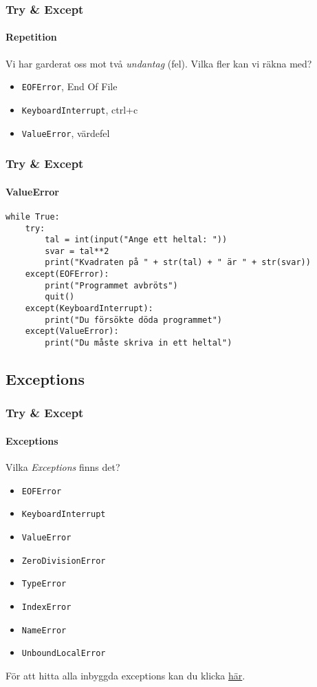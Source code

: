 \documentclass[aspectratio=169]{beamer}
\begin{document}
\begin{frame}
	\frametitle{Try \& Except}
	\framesubtitle{Repetition}
	
	Vi har garderat oss mot två \textit{undantag} (fel). Vilka fler kan vi räkna med?
	
	\begin{itemize}
		\item \texttt{EOFError}, End Of File
		\item \texttt{KeyboardInterrupt}, ctrl+c
		\item<2-> \texttt{ValueError}, värdefel
	\end{itemize}
\end{frame}

\begin{frame}[fragile]
	\frametitle{Try \& Except}
	\framesubtitle{ValueError}
	
	\begin{lstlisting}
while True:
    try:
        tal = int(input("Ange ett heltal: "))
        svar = tal**2
        print("Kvadraten på " + str(tal) + " är " + str(svar))
    except(EOFError):
        print("Programmet avbröts")
        quit()
    except(KeyboardInterrupt):
        print("Du försökte döda programmet")
    except(ValueError):
        print("Du måste skriva in ett heltal")
	\end{lstlisting}
	
\end{frame}

\subsection{Exceptions}

\begin{frame}
	\frametitle{Try \& Except}
	\framesubtitle{Exceptions}
	
	Vilka \textit{Exceptions} finns det?
	
	\begin{itemize}
		\item \texttt{EOFError}
		\item \texttt{KeyboardInterrupt}
		\item \texttt{ValueError}
		\item<2-> \texttt{ZeroDivisionError}
		\item<2-> \texttt{TypeError}
		\item<2-> \texttt{IndexError}
		\item<2-> \texttt{NameError}
		\item<2-> \texttt{UnboundLocalError}
	\end{itemize}
	
	För att hitta alla inbyggda exceptions kan du klicka \href{https://docs.python.org/3/library/exceptions.html}{här}.
	
\end{frame}
\end{document}
